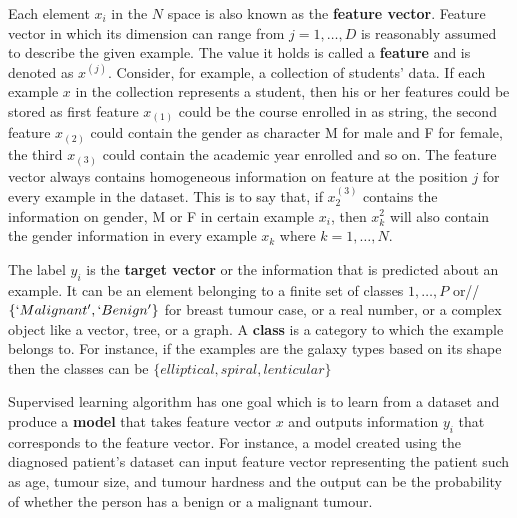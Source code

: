 Each element $x_i$ in the $N$ space is also known as the \textbf{feature vector}. Feature vector in which its dimension can range from $j=1,\ldots,D$ is reasonably assumed to describe the given example. The value it holds is called a \textbf{feature} and is denoted as $x^{(j)}$. Consider, for example, a collection of students' data. If each example $x$ in the collection represents a student, then his or her features could be stored as first feature $x_{(1)}$ could be the course enrolled in as string, the second feature $x_{(2)}$ could contain the gender as character M for male and F for female, the third $x_{(3)}$ could contain the academic year enrolled and so on. The feature vector always contains homogeneous information on feature at the position $j$ for every example in the dataset. This is to say that, if $x^{(3)}_2$ contains the information on gender, M or F in certain example $x_i$, then $x^{2}_k$ will also contain the gender information in every example $x_k$ where $k=1,\ldots,N$.

The label $y_i$ is the \textbf{target vector} or the information that is predicted about an example. It can be an element belonging to a finite set of classes ${1,\ldots, P}$ or// $\{`Malignant', `Benign'\}$ for breast tumour case, or a real number, or a complex object like a vector, tree, or a graph. A \textbf{class} is a category to which the example belongs to. For instance, if the examples are the galaxy types based on its shape then the classes can be $\{elliptical, spiral, lenticular\}$

Supervised learning algorithm has one goal which is to learn from a dataset and produce a \textbf{model} that takes feature vector $x$ and outputs information $y_i$ that corresponds to the feature vector. For instance, a model created using the diagnosed patient's dataset can input feature vector representing the patient such as age, tumour size, and tumour hardness and the output can be the probability of whether the person has a benign or a malignant tumour.

